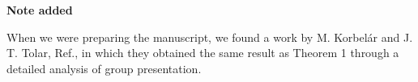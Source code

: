 \documentclass[12pt]{iopart}
\begin{document}
\vspace{10mm}

\noindent
{\bf Note added}
\vspace{2mm}

When we were preparing the manuscript, we found a work by M. Korbel\'ar and J. T. Tolar,
Ref.\cite{Korbelar-Tolar_2023},
in which they obtained the same result as Theorem 1 through a detailed analysis
of group presentation.

%
%
%
%
\end{document}
